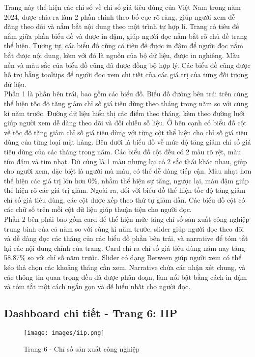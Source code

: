 \documentclass[a4paper]{report}
\begin{document}
{{Trang này thể hiện các chỉ số về chỉ số giá tiêu dùng của Việt Nam trong năm 2024, được chia ra làm 2 phần chính theo bố cục rõ ràng, giúp người xem dễ dàng theo dõi và nắm bắt nội dung theo một trình tự hợp lí. Trang có tiêu đề nằm giữa phần biểu đồ và được in đậm, giúp người đọc nắm bắt rõ chủ đề trang thể hiện. Tương tự, các biểu đồ cũng có tiêu đề được in đậm để người đọc nắm bắt được nội dung, kèm với đó là nguồn của bộ dữ liệu, được in nghiêng. Màu nền và màu sắc của biểu đồ cũng đã được đồng bộ hợp lý. Các biểu đồ cũng được hỗ trợ bằng tooltips để người đọc xem chi tiết của các giá trị của từng đối tượng dữ liệu.\\
Phần 1 là phần bên trái, bao gồm các biểu đồ. Biểu đồ đường bên trái trên cùng thể hiện tốc độ tăng giảm chỉ số giá tiêu dùng theo tháng trong năm so với cùng kì năm trước. Đường dữ liệu hiển thị các điểm theo tháng, kèm theo đường lưới giúp người xem dễ dàng theo dõi và đối chiếu số liệu. Ở bên cạnh có biểu đồ cột về tốc đồ tăng giảm chỉ số giá tiêu dùng với từng cột thể hiện cho chỉ số giá tiêu dùng của từng loại mặt hàng. Bên dưới là biểu đồ về mức độ tăng giảm chỉ số giá tiêu dùng của các tháng trong năm. Các biểu đồ cột đều có 2 màu rõ rệt, màu tím đậm và tím nhạt. Dù cùng là 1 màu nhưng lại có 2 sắc thái khác nhau, giúp cho người xem, đặc biệt là người mù màu, có thể dễ dàng tiếp cận. Màu nhạt hơn thể hiện các giá trị lớn hơn 0\%, nhằm thể hiện sự tăng, ngược lại, màu đậm giúp thể hiện rõ các giá trị giảm. Ngoài ra, đối với biểu đồ thể hiện tốc độ tăng giảm chỉ số giá tiêu dùng, các cột được xếp theo thứ tự giảm dần. Các biểu đồ cột có các chữ số trên mỗi cột dữ liệu giúp thuận tiện cho người đọc.\\
Phần 2 bên phải bao gồm card để thể hiện mức tăng chỉ số sản xuất công nghiệp trung bình của cả năm so với cùng kì năm trước, slider giúp người đọc theo dõi và dễ dàng đọc các tháng của các biểu đồ phần bên trái, và narrative để tóm tắt lại các nội dung chính của trang. Card chỉ ra chỉ số giá tiêu dùng năm nay tăng 58.87\% so với chỉ số năm trước. Slider có dạng Between giúp người xem có thể kéo thả chọn các khoảng tháng cần xem. Narrative chứa các nhận xét chung, và các thông tin quan trọng đều đã được phân đoạn, làm nổi bật bằng cách in đậm và tóm tắt một cách ngắn gọn và dễ hiểu nhất cho người đọc.
\newpage
\subsection{Dashboard chi tiết - Trang 6: IIP}

\begin{figure}[H]
    \centering
    \texttt{[image: images/iip.png]}
    \caption{Trang 6 - Chỉ số sản xuất công nghiệp}
    \label{fig:enter-label}
\end{figure}

}}
\end{document}
